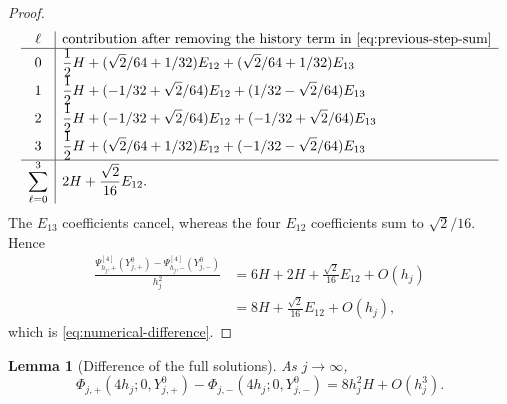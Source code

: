 \documentclass[]{article}
\numberwithin{equation}{section}
\theoremstyle{plain}
\newtheorem{lemma}[theorem]{Lemma}
\theoremstyle{remark}
\begin{document}
\begin{proof}
\begin{equation}
\begin{array}{c|l}
\ell&\text{contribution after removing the history term in
\eqref{eq:previous-step-sum}}\\
\hline
0&\displaystyle \frac12H+(\sqrt2/64+1/32)E_{12}
 +(\sqrt2/64+1/32)E_{13}\\[1mm]
1&\displaystyle \frac12H+(-1/32+\sqrt2/64)E_{12}
 +(1/32-\sqrt2/64)E_{13}\\[1mm]
2&\displaystyle \frac12H+(-1/32+\sqrt2/64)E_{12}
 +(-1/32+\sqrt2/64)E_{13}\\[1mm]
3&\displaystyle \frac12H+(\sqrt2/64+1/32)E_{12}
 +(-1/32-\sqrt2/64)E_{13}\\[1mm]
\hline
\displaystyle\sum_{\ell=0}^3
 &\displaystyle 2H+\frac{\sqrt2}{16}E_{12}.
\end{array}
\end{equation}
The $E_{13}$ coefficients cancel, whereas the four $E_{12}$
coefficients sum to $\sqrt2/16$.  Hence
\begin{align*}
 \frac{\Psi^{[4]}_{h_j,+}(Y_{j,+}^0)-\Psi^{[4]}_{h_j,-}(Y_{j,-}^0)}{h_j^2}
 &=6H+2H+\frac{\sqrt2}{16}E_{12}+O(h_j)\\
 &=8H+\frac{\sqrt2}{16}E_{12}+O(h_j),
\end{align*}
which is \eqref{eq:numerical-difference}.
\end{proof}

\begin{lemma}[Difference of the full solutions]
\label{lem:full-flow-difference}
As $j\to\infty$,
\begin{equation}\label{eq:full-flow-difference}
 \Phi_{j,+}(4h_j;0,Y_{j,+}^0)-\Phi_{j,-}(4h_j;0,Y_{j,-}^0)
 =8h_j^2H+O(h_j^3).
\end{equation}
\end{lemma}
\end{document}
